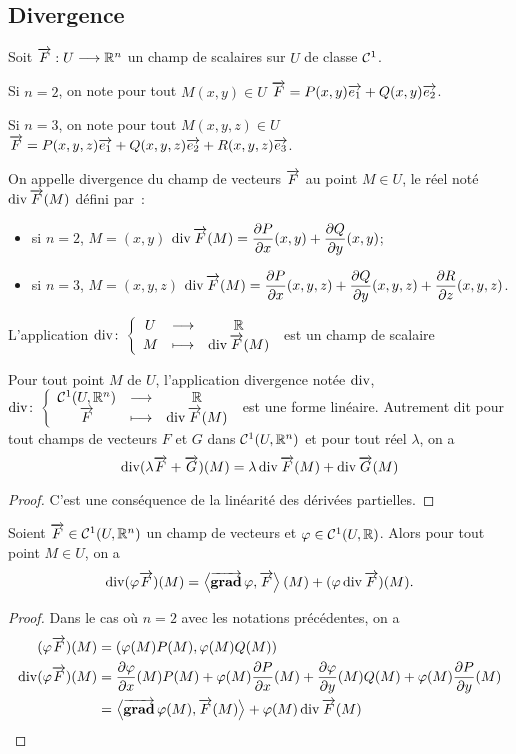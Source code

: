 \subsection{Divergence}

Soit \(\overrightarrow{F} : U \longrightarrow \mathbb{R}^n\) un champ de scalaires sur \(U\) de classe \(\mathcal{C}^{1}\).

Si \(n=2\), on note pour tout \(M(x,y) \in U\) \(\overrightarrow{F}=P(x,y)\overrightarrow{e_1} + Q(x,y)\overrightarrow{e_2}\).

Si \(n=3\), on note pour tout \(M(x,y,z) \in U\) \(\overrightarrow{F}=P(x,y,z)\overrightarrow{e_1} + Q(x,y,z)\overrightarrow{e_2}+R(x,y,z)\overrightarrow{e_3}\).

\begin{defdef}
  On appelle divergence du champ de vecteurs \(\overrightarrow{F}\) au point \(M \in U\), le réel noté \(\operatorname{div} \overrightarrow{F}(M)\) défini par~:
  \begin{itemize}
  \item si \(n=2\), \(M=(x,y)\) \(\operatorname{div} \overrightarrow{F}(M)=\dfrac{\partial{} P}{\partial{} x}(x,y) + \dfrac{\partial{} Q}{\partial{} y}(x,y)\);
  \item si \(n=3\), \(M=(x,y,z)\) \(\operatorname{div} \overrightarrow{F}(M)=\dfrac{\partial{} P}{\partial{} x}(x,y,z) + \dfrac{\partial{} Q}{\partial{} y}(x,y,z) + \dfrac{\partial{} R}{\partial{} z}(x,y,z)\).
  \end{itemize}
  L'application \(\operatorname{div}\colon \left\{\begin{array}{ccc} U & \longrightarrow &\mathbb{R}\\ M & \longmapsto & \operatorname{div} \overrightarrow{F}(M) \end{array} \right.\) est un champ de scalaire
\end{defdef}
%
\begin{prop}
  Pour tout point \(M\) de \(U\), l'application divergence notée \(\operatorname{div}\), \(\operatorname{div}\colon \left\{\begin{array}{ccc} \mathcal{C}^{1}(U, \mathbb{R}^n) & \longrightarrow &\mathbb{R}\\ \overrightarrow{F} & \longmapsto & \operatorname{div}\overrightarrow{F}(M) \end{array} \right.\) est une forme linéaire. Autrement dit pour tout champs de vecteurs \(F\) et \(G\) dans \(\mathcal{C}^{1}(U, \mathbb{R}^n)\) et pour tout réel \(\lambda\), on a
  \begin{equation}
    \operatorname{div}(\lambda \overrightarrow{F} + \overrightarrow{G})(M) = \lambda \operatorname{div} \overrightarrow{F}(M) + \operatorname{div} \overrightarrow{G}(M)
  \end{equation}
\end{prop}
\begin{proof}
  C'est une conséquence de la linéarité des dérivées partielles.
\end{proof}
%
\begin{prop}
  Soient \(\overrightarrow{F} \in \mathcal{C}^{1}(U, \mathbb{R}^n)\) un champ de vecteurs et \(\varphi \in \mathcal{C}^{1}(U, \mathbb{R})\). Alors pour tout point \(M \in U\), on a
  \begin{equation}
    \operatorname{div}(\varphi \overrightarrow{F})(M)=\left\langle{\operatorname{\overrightarrow{\mathbf{grad}}}{\varphi}},{\overrightarrow{F}}\right\rangle(M) + (\varphi \operatorname{div} \overrightarrow{F})(M).
  \end{equation}
\end{prop}
\begin{proof}
  Dans le cas où \(n=2\) avec les notations précédentes, on a
  \begin{align}
    (\varphi \overrightarrow{F})(M)& = (\varphi(M) P(M), \varphi(M) Q(M)) \\
    \operatorname{div}(\varphi \overrightarrow{F})(M)& = \dfrac{\partial{} \varphi}{\partial{} x}(M)  P(M) + \varphi(M) \dfrac{\partial{} P}{\partial{} x}(M) + \dfrac{\partial{} \varphi}{\partial{} y}(M)  Q(M) + \varphi(M) \dfrac{\partial{} P}{\partial{} y}(M) \\
    &=\left\langle{\operatorname{\overrightarrow{\mathbf{grad}}}{\varphi}(M)},{\overrightarrow{F}(M)}\right\rangle + \varphi(M)\operatorname{div}\overrightarrow{F}(M)
  \end{align}
\end{proof}

